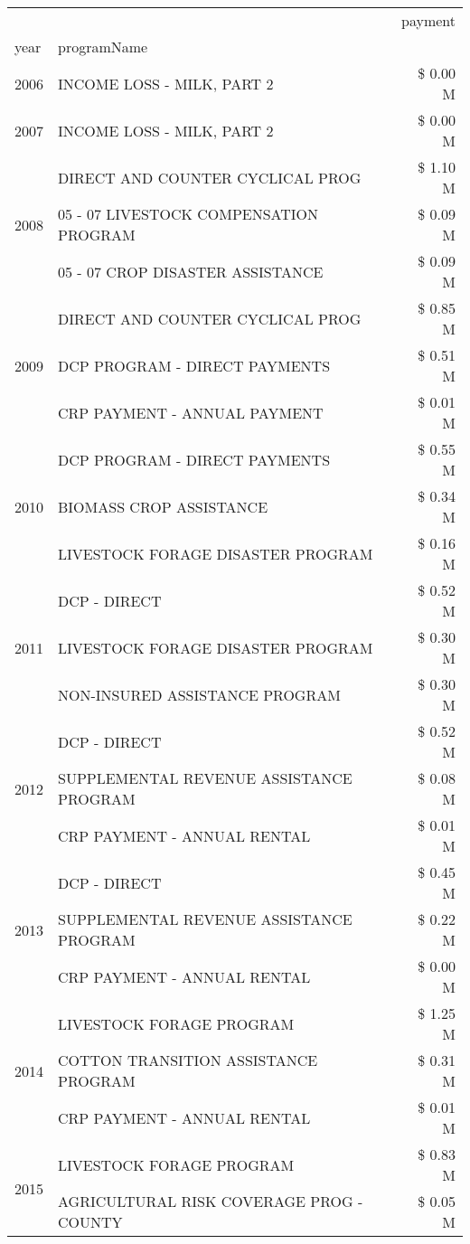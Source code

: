 \begin{tabular}{llr}
\toprule
 &  & payment \\
year & programName &  \\
\midrule
2006 & INCOME LOSS - MILK, PART 2 & \$ 0.00 M \\
\cline{1-3}
2007 & INCOME LOSS - MILK, PART 2 & \$ 0.00 M \\
\cline{1-3}
\multirow[t]{3}{*}{2008} & DIRECT AND COUNTER CYCLICAL PROG & \$ 1.10 M \\
 & 05 - 07 LIVESTOCK COMPENSATION PROGRAM & \$ 0.09 M \\
 & 05 - 07 CROP DISASTER ASSISTANCE & \$ 0.09 M \\
\cline{1-3}
\multirow[t]{3}{*}{2009} & DIRECT AND COUNTER CYCLICAL PROG & \$ 0.85 M \\
 & DCP PROGRAM - DIRECT PAYMENTS & \$ 0.51 M \\
 & CRP PAYMENT - ANNUAL PAYMENT & \$ 0.01 M \\
\cline{1-3}
\multirow[t]{3}{*}{2010} & DCP PROGRAM - DIRECT PAYMENTS & \$ 0.55 M \\
 & BIOMASS CROP ASSISTANCE & \$ 0.34 M \\
 & LIVESTOCK FORAGE DISASTER  PROGRAM & \$ 0.16 M \\
\cline{1-3}
\multirow[t]{3}{*}{2011} & DCP - DIRECT & \$ 0.52 M \\
 & LIVESTOCK FORAGE DISASTER PROGRAM & \$ 0.30 M \\
 & NON-INSURED ASSISTANCE PROGRAM & \$ 0.30 M \\
\cline{1-3}
\multirow[t]{3}{*}{2012} & DCP - DIRECT & \$ 0.52 M \\
 & SUPPLEMENTAL REVENUE ASSISTANCE PROGRAM & \$ 0.08 M \\
 & CRP PAYMENT - ANNUAL RENTAL & \$ 0.01 M \\
\cline{1-3}
\multirow[t]{3}{*}{2013} & DCP - DIRECT & \$ 0.45 M \\
 & SUPPLEMENTAL REVENUE ASSISTANCE PROGRAM & \$ 0.22 M \\
 & CRP PAYMENT - ANNUAL RENTAL & \$ 0.00 M \\
\cline{1-3}
\multirow[t]{3}{*}{2014} & LIVESTOCK FORAGE PROGRAM & \$ 1.25 M \\
 & COTTON TRANSITION ASSISTANCE PROGRAM & \$ 0.31 M \\
 & CRP PAYMENT - ANNUAL RENTAL & \$ 0.01 M \\
\cline{1-3}
\multirow[t]{3}{*}{2015} & LIVESTOCK FORAGE PROGRAM & \$ 0.83 M \\
 & AGRICULTURAL RISK COVERAGE PROG - COUNTY & \$ 0.05 M \\

\end{tabular}
